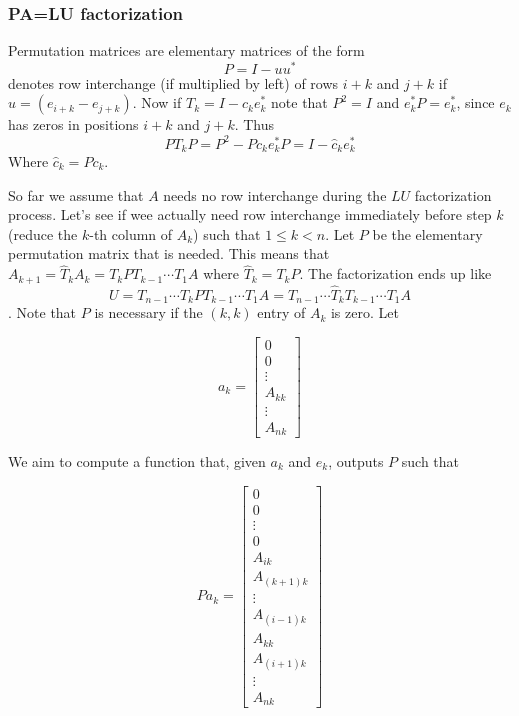 \subsubsection{PA=LU factorization}

Permutation matrices are elementary matrices of the form $$P=I-uu^*$$ denotes row interchange (if multiplied by left) of rows $i+k$ and $j+k$ if $u=(e_{i+k}-e_{j+k})$. Now if $T_{k} = I-c_ke_k^*$ note that $P^2=I$ and $e_k^*P=e_k^*$, since $e_{k}$ has zeros in positions $i+k$ and $j+k$. Thus $$PT_kP=P^2-Pc_ke_k^*P=I-\widehat{c}_ke_k^*$$ Where $\widehat{c}_k=Pc_k$.

So far we assume that $A$ needs no row interchange during the $LU$ factorization process. Let's see if wee actually need row interchange immediately before step $k$ (reduce the $k$-th column of $A_{k}$) such that $1 \leq k < n$. Let $P$ be the elementary permutation matrix that is needed. This means that $A_{k+1}=\widehat{T}_kA_k=T_kPT_{k-1}\cdots T_1A$ where $\widehat{T}_k=T_{k}P$. The factorization ends up like $$U=T_{n-1}\cdots T_{k}PT_{k-1}\cdots T_1A = T_{n-1}\cdots \widehat{T}_{k}T_{k-1}\cdots T_1A$$. Note that $P$ is necessary if the $(k,k)$ entry of $A_{k}$ is zero. Let 

\[
a_k = 
\begin{bmatrix}
    0 \\
    0 \\
    \vdots \\
    A_{kk} \\
     \vdots \\
    A_{nk}
\end{bmatrix}
\]

We aim to compute a function that, given $a_k$ and $e_k$, outputs $P$ such that

\[
Pa_k = 
\begin{bmatrix}
    0 \\
    0 \\
    \vdots \\
    0 \\
    A_{ik} \\
    A_{(k+1)k}\\
    \vdots \\
    A_{(i-1)k} \\
    A_{kk} \\
    A_{(i+1)k} \\
    \vdots \\
    A_{nk}
\end{bmatrix}
\]


